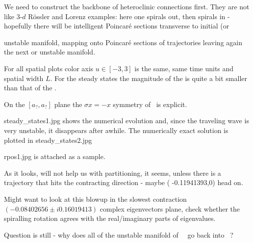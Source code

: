 We need to construct the backbone of heteroclinic connections
first. They are not like 3-$d$ R\"ossler and Lorenz examples:
here one spirals out,
then spirals in - hopefully there will be intelligent Poincar\'e sections
transverse to initial  (or { unstable manifold, mapping onto
Poincar\'e sections of trajectories leaving again
the next  or  unstable manifold.

%

For all spatial plots color axis $u \in [-3, 3]$ is the same,
same time units and spatial width $L$.
For the steady states the magnitude of the  is quite
a bit smaller than that of the .

On the
    $[a_?,a_?]$ plane
    the $\sigma x = -x$ symmetry of \KSe\ is explicit.


steady\_states1.jpg shows the numerical evolution and, since the
traveling wave is very unstable, it disappears after awhile.
The numerically exact solution is plotted in steady\_states2.jpg

rpos1.jpg is attached as a sample.

As it looks, will not help us with partitioning, it seems, unless there is
a trajectory that hits the contracting direction - maybe
( -0.11941393,0)
head on.

Might want to look at this blowup in
the  slowest contraction
$   ( -0.08402656 \pm i 0.16019413)$
complex eigenvectors plane, check whether the
spiralling rotation agrees with the real/imaginary parts of eigenvalues.

Question is still - why does all of the unstable manifold of
~\eqv\ go back
into
~\eqv?


}
